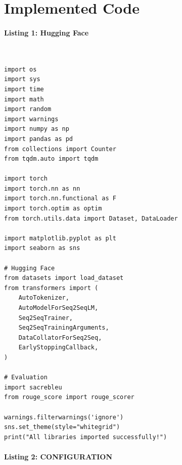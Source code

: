 \documentclass[12pt,a4paper,oneside]{report}
\begin{document}
\section{Implemented Code}
\paragraph{Listing 1: Hugging Face}\mbox{}\\[-1ex]
\begin{Verbatim}[commandchars=\\\{\},breaklines=true,breakanywhere=true,fontsize=\scriptsize,frame=leftline,framesep=2mm,rulecolor=\color{gray}]
import os
import sys
import time
import math
import random
import warnings
import numpy as np
import pandas as pd
from collections import Counter
from tqdm.auto import tqdm

import torch
import torch.nn as nn
import torch.nn.functional as F
import torch.optim as optim
from torch.utils.data import Dataset, DataLoader

import matplotlib.pyplot as plt
import seaborn as sns

# Hugging Face
from datasets import load_dataset
from transformers import (
    AutoTokenizer,
    AutoModelForSeq2SeqLM,
    Seq2SeqTrainer,
    Seq2SeqTrainingArguments,
    DataCollatorForSeq2Seq,
    EarlyStoppingCallback,
)

# Evaluation
import sacrebleu
from rouge_score import rouge_scorer

warnings.filterwarnings('ignore')
sns.set_theme(style="whitegrid")
print("All libraries imported successfully!")
\end{Verbatim}
\paragraph{Listing 2: CONFIGURATION}\mbox{}\\[-1ex]
\end{document}
